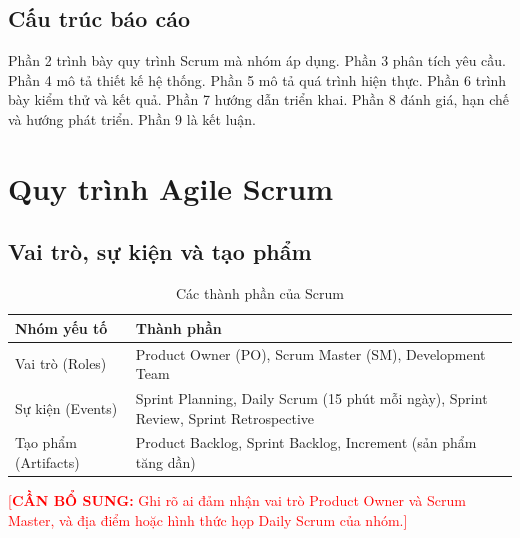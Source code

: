 \documentclass[a4paper]{article}
\newcommand{\chen}[1]{\textcolor{red}{[\textbf{CẦN BỔ SUNG:} #1]}}
\begin{document}
\subsection{Cấu trúc báo cáo}
Phần 2 trình bày quy trình Scrum mà nhóm áp dụng. Phần 3 phân tích yêu cầu. Phần 4 mô tả thiết kế hệ thống. Phần 5 mô tả quá trình hiện thực. Phần 6 trình bày kiểm thử và kết quả. Phần 7 hướng dẫn triển khai. Phần 8 đánh giá, hạn chế và hướng phát triển. Phần 9 là kết luận.

\newpage
\section{Quy trình Agile Scrum}
\subsection{Vai trò, sự kiện và tạo phẩm}
\begin{table}[h!]
\centering
\begin{tabularx}{\textwidth}{|l|X|}
\hline
\textbf{Nhóm yếu tố} & \textbf{Thành phần} \\ \hline
Vai trò (Roles) & Product Owner (PO), Scrum Master (SM), Development Team \\ \hline
Sự kiện (Events) & Sprint Planning, Daily Scrum (15 phút mỗi ngày), Sprint Review, Sprint Retrospective \\ \hline
Tạo phẩm (Artifacts) & Product Backlog, Sprint Backlog, Increment (sản phẩm tăng dần) \\ \hline
\end{tabularx}
\caption{Các thành phần của Scrum}
\end{table}

\chen{Ghi rõ ai đảm nhận vai trò Product Owner và Scrum Master, và địa điểm hoặc hình thức họp Daily Scrum của nhóm.}
\end{document}
